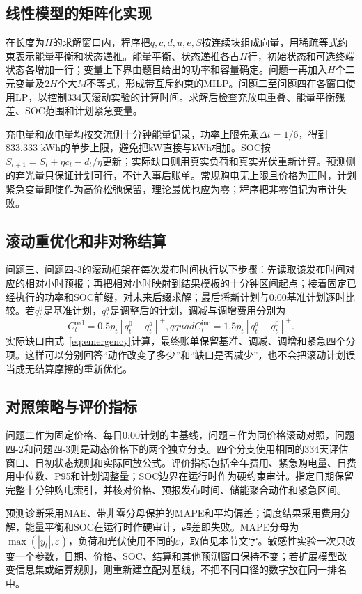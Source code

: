 \documentclass[UTF8,12pt,a4paper]{ctexart}
\begin{document}
\subsection{线性模型的矩阵化实现}
在长度为$H$的求解窗口内，程序把$q,c,d,u,e,S$按连续块组成向量，用稀疏等式约束表示能量平衡和状态递推。能量平衡、状态递推各占$H$行，初始状态和可选终端状态各增加一行；变量上下界由题目给出的功率和容量确定。问题一再加入$H$个二元变量及$2H$个大$M$不等式，形成带互斥约束的MILP。问题二至问题四在各窗口使用LP，以控制334天滚动实验的计算时间。求解后检查充放电重叠、能量平衡残差、SOC范围和计划紧急变量。

充电量和放电量均按交流侧十分钟能量记录，功率上限先乘$\Delta t=1/6$，得到833.333 kWh的单步上限，避免把kW直接与kWh相加。SOC按$S_{t+1}=S_t+\eta c_t-d_t/\eta$更新；实际缺口则用真实负荷和真实光伏重新计算。预测侧的弃光量只保证计划可行，不计入事后账单。常规购电无上限且价格为正时，计划紧急变量即使作为高价松弛保留，理论最优也应为零；程序把非零值记为审计失败。

\subsection{滚动重优化和非对称结算}
问题三、问题四-3的滚动框架在每次发布时间执行以下步骤：先读取该发布时间对应的相对小时预报；再把相对小时映射到结果模板的十分钟区间起点；接着固定已经执行的功率和SOC前缀，对未来后缀求解；最后将新计划与0:00基准计划逐时比较。若$q_t^0$是基准计划，$q_t^a$是调整后的计划，调减与调增费用分别为
\begin{equation}
C_t^{\mathrm{red}}=0.5p_t[q_t^0-q_t^a]^+,qquad C_t^{\mathrm{inc}}=1.5p_t[q_t^a-q_t^0]^+.
\end{equation}
实际缺口由式~\eqref{eq:emergency}计算，最终账单保留基准、调减、调增和紧急四个分项。这样可以分别回答“动作改变了多少”和“缺口是否减少”，也不会把滚动计划误当成无结算摩擦的重新优化。

\subsection{对照策略与评价指标}
问题二作为固定价格、每日0:00计划的主基线，问题三作为同价格滚动对照，问题四-2和问题四-3则是动态价格下的两个独立分支。四个分支使用相同的334天评估窗口、日初状态规则和实际回放公式。评价指标包括全年费用、紧急购电量、日费用中位数、P95和计划调整量；SOC边界在运行时作为硬约束审计。指定日期保留完整十分钟购电索引，并核对价格、预报发布时间、储能聚合动作和紧急区间。

预测诊断采用MAE、带非零分母保护的MAPE和平均偏差；调度结果采用费用分解，能量平衡和SOC在运行时作硬审计，超差即失败。MAPE分母为$\max(|y_t|,\varepsilon)$，负荷和光伏使用不同的$\varepsilon$，取值见本节文字。敏感性实验一次只改变一个参数，日期、价格、SOC、结算和其他预测窗口保持不变；若扩展模型改变信息集或结算规则，则重新建立配对基线，不把不同口径的数字放在同一排名中。
\end{document}
